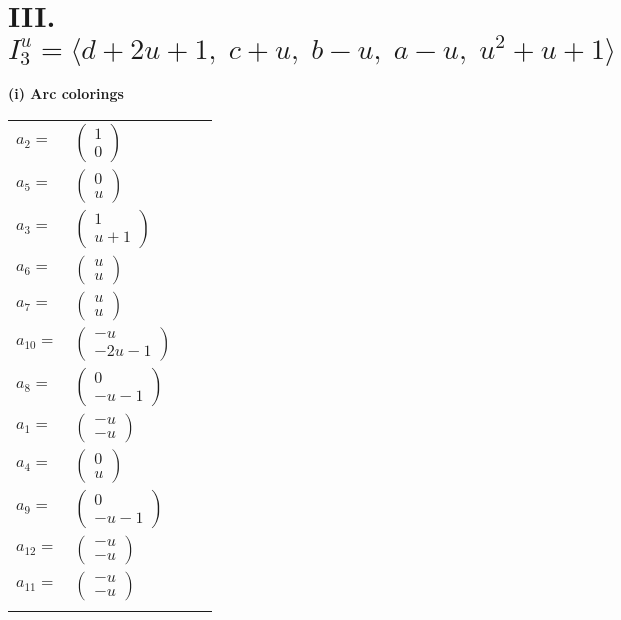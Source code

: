\documentclass[1p]{elsarticle_modified}
\theoremstyle{definition}
\begin{document}
\centering \section*{III. $I^u_{3}= \langle d+2 u+1,\;c+u,\;b- u,\;a- u,\;u^2+u+1 \rangle$}
\flushleft \textbf{(i) Arc colorings}\\
\begin{tabular}{m{7pt} m{180pt} m{7pt} m{180pt} }
\flushright $a_{2}=$&$\begin{pmatrix}1\\0\end{pmatrix}$ \\
\flushright $a_{5}=$&$\begin{pmatrix}0\\u\end{pmatrix}$ \\
\flushright $a_{3}=$&$\begin{pmatrix}1\\u+1\end{pmatrix}$ \\
\flushright $a_{6}=$&$\begin{pmatrix}u\\u\end{pmatrix}$ \\
\flushright $a_{7}=$&$\begin{pmatrix}u\\u\end{pmatrix}$ \\
\flushright $a_{10}=$&$\begin{pmatrix}- u\\-2 u-1\end{pmatrix}$ \\
\flushright $a_{8}=$&$\begin{pmatrix}0\\- u-1\end{pmatrix}$ \\
\flushright $a_{1}=$&$\begin{pmatrix}- u\\- u\end{pmatrix}$ \\
\flushright $a_{4}=$&$\begin{pmatrix}0\\u\end{pmatrix}$ \\
\flushright $a_{9}=$&$\begin{pmatrix}0\\- u-1\end{pmatrix}$ \\
\flushright $a_{12}=$&$\begin{pmatrix}- u\\- u\end{pmatrix}$ \\
\flushright $a_{11}=$&$\begin{pmatrix}- u\\- u\end{pmatrix}$\\&\end{tabular}
\end{document}
